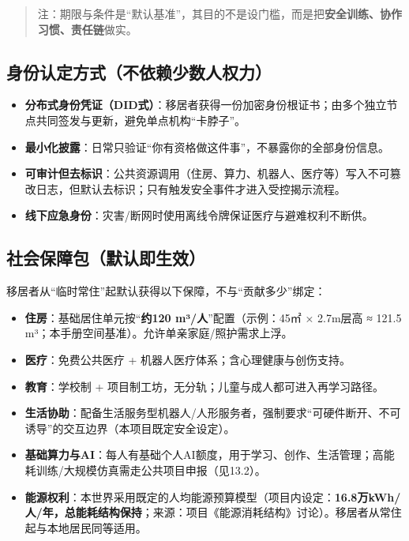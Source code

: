 \begin{quote}
注：期限与条件是``默认基准''，其目的不是设门槛，而是把\textbf{安全训练、协作习惯、责任链}做实。

\end{quote}

\subsection{身份认定方式（不依赖少数人权力）}\label{ux8eabux4efdux8ba4ux5b9aux65b9ux5f0fux4e0dux4f9dux8d56ux5c11ux6570ux4ebaux6743ux529b}

\begin{itemize}
\item
  \textbf{分布式身份凭证（DID式）}：移居者获得一份加密身份根证书；由多个独立节点共同签发与更新，避免单点机构``卡脖子''。
\item
  \textbf{最小化披露}：日常只验证``你有资格做这件事''，不暴露你的全部身份信息。
\item
  \textbf{可审计但去标识}：公共资源调用（住房、算力、机器人、医疗等）写入不可篡改日志，但默认去标识；只有触发安全事件才进入受控揭示流程。
\item
  \textbf{线下应急身份}：灾害/断网时使用离线令牌保证医疗与避难权利不断供。
\end{itemize}

\subsection{社会保障包（默认即生效）}\label{ux793eux4f1aux4fddux969cux5305ux9ed8ux8ba4ux5373ux751fux6548}

移居者从``临时常住''起默认获得以下保障，不与``贡献多少''绑定：

\begin{itemize}
\item
  \textbf{住房}：基础居住单元按``\textbf{约120 m³/人}''配置（示例：45㎡ × 2.7m层高 ≈ 121.5 m³；本手册空间基准）。允许单亲家庭/照护需求上浮。
\item
  \textbf{医疗}：免费公共医疗 + 机器人医疗体系；含心理健康与创伤支持。
\item
  \textbf{教育}：学校制 + 项目制工坊，无分轨；儿童与成人都可进入再学习路径。
\item
  \textbf{生活协助}：配备生活服务型机器人/人形服务者，强制要求``可硬件断开、不可诱导''的交互边界（本项目既定安全设定）。
\item
  \textbf{基础算力与AI}：每人有基础个人AI额度，用于学习、创作、生活管理；高能耗训练/大规模仿真需走公共项目申报（见13.2）。
\item
  \textbf{能源权利}：本世界采用既定的人均能源预算模型（项目内设定：\textbf{16.8万kWh/人/年，总能耗结构保持}；来源：项目《能源消耗结构》讨论）。移居者从常住起与本地居民同等适用。
\end{itemize}

